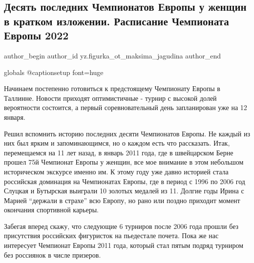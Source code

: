  
 
 
 
 
\subsection{Десять последних Чемпионатов Европы у женщин в кратком изложении. Расписание Чемпионата Европы 2022}
\label{sec:04_01_2022.yz.figurka_ot_maksima_jagudina.1.chempionaty_evropy}


\ifcmt
 author_begin
   author_id yz.figurka_ot_maksima_jagudina
 author_end
\fi

\ifcmt
	globals
	@captionsetup font=huge
\fi

Начинаем постепенно готовиться к предстоящему Чемпионату Европы в Таллинне.
Новости приходят оптимистичные - турнир с высокой долей вероятности состоится,
а первый соревновательный день запланирован уже на 12 января.


Решил вспомнить историю последних десяти Чемпионатов Европы. Не каждый из них
был ярким и запоминающимся, но о каждом есть что рассказать. Итак, перемещаемся
на 11 лет назад, в январь 2011 года, где в швейцарском Берне прошел 75й
Чемпионат Европы у женщин, все мое внимание в этом небольшом историческом
экскурсе именно им. К этому году уже давно историей стала российская доминация
на Чемпионатах Европы, где в период с 1996 по 2006 год Слуцкая и Бутырская
выиграли 10 золотых медалей из 11. Долгие годы Ирина с Марией \enquote{держали в
страхе} всю Европу, но рано или поздно приходит момент окончания спортивной
карьеры.

Забегая вперед скажу, что следующие 6 турниров после 2006 года прошли без
присутствия российских фигуристок на пьедестале почета. Пока же нас интересует
Чемпионат Европы 2011 года, который стал пятым подряд турниром без россиянок в
числе призеров.



